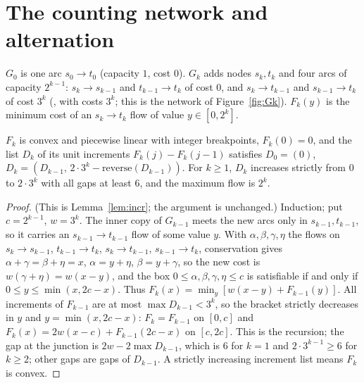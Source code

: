 \section{The counting network and alternation}\label{sec:sh-net}

$G_0$ is one arc $s_0\to t_0$ (capacity $1$, cost $0$). $G_k$ adds nodes $s_k,t_k$ and four arcs of
capacity $2^{k-1}$: $s_k\to s_{k-1}$ and $t_{k-1}\to t_k$ of cost $0$, and $s_k\to t_{k-1}$ and
$s_{k-1}\to t_k$ of cost $3^k$ (\cite[\S3.1]{ds15}, with costs $3^k$; this is the network of
Figure~\ref{fig:Gk}). $F_k(y)$ is the minimum cost of an $s_k\to t_k$ flow of value $y\in[0,2^k]$.

\begin{lemma}[Increments]\label{lem:sh-incr}
\statuslean
$F_k$ is convex and piecewise linear with integer breakpoints, $F_k(0)=0$, and the list $D_k$ of its unit
increments $F_k(j)-F_k(j-1)$ satisfies $D_0=(0)$, $D_k=(D_{k-1},\,2\cdot3^k-\mathrm{reverse}(D_{k-1}))$.
For $k\ge1$, $D_k$ increases strictly from $0$ to $2\cdot3^k$ with all gaps at least $6$, and the maximum
flow is $2^k$.
\end{lemma}

\begin{proof}
(This is Lemma~\ref{lem:incr}; the argument is unchanged.) Induction; put $c=2^{k-1}$, $w=3^k$. The
inner copy of $G_{k-1}$ meets the new arcs only in $s_{k-1},t_{k-1}$, so it carries an $s_{k-1}\to
t_{k-1}$ flow of some value $y$. With $\alpha,\beta,\gamma,\eta$ the flows on $s_k\to s_{k-1}$,
$t_{k-1}\to t_k$, $s_k\to t_{k-1}$, $s_{k-1}\to t_k$, conservation gives $\alpha+\gamma=\beta+\eta=x$,
$\alpha=y+\eta$, $\beta=y+\gamma$, so the new cost is $w(\gamma+\eta)=w(x-y)$, and the box
$0\le\alpha,\beta,\gamma,\eta\le c$ is satisfiable if and only if $0\le y\le\min(x,2c-x)$. Thus
$F_k(x)=\min_y[w(x-y)+F_{k-1}(y)]$. All increments of $F_{k-1}$ are at most $\max D_{k-1}<3^k$, so the
bracket strictly decreases in $y$ and $y=\min(x,2c-x)$: $F_k=F_{k-1}$ on $[0,c]$ and
$F_k(x)=2w(x-c)+F_{k-1}(2c-x)$ on $[c,2c]$. This is the recursion; the gap at the junction is
$2w-2\max D_{k-1}$, which is $6$ for $k=1$ and $2\cdot3^{k-1}\ge6$ for $k\ge2$; other gaps are gaps of
$D_{k-1}$. A strictly increasing increment list means $F_k$ is convex.
\end{proof}

